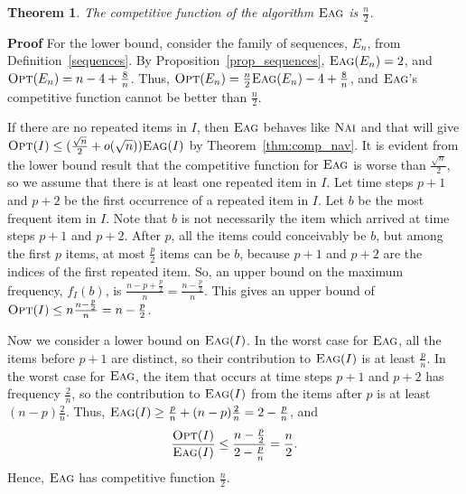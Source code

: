 \documentclass[11pt]{article}
\newtheorem{xtheorem}{Theorem}
\newenvironment{theorem}{\begin{xtheorem}\rm}{\end{xtheorem}}
\newenvironment{proof}{\begin{trivlist}\item[]{\bf Proof }}{\hspace*{\fill}\raisebox{-1pt}{\boldmath$\Box$}\end{trivlist}}
\newcommand{\opt}{{\ensuremath{\textsc{Opt}}}\xspace}
\newcommand{\nav}{{\ensuremath{\textsc{Nai}}}\xspace}
\newcommand{\eag}{{\ensuremath{\textsc{Eag}}}\xspace}
\begin{document}
\begin{theorem}\label{thm:comp_eag}
The competitive function of the algorithm \eag is $\frac{n}{2}$.
\end{theorem}
\begin{proof}
For the lower bound, consider the family of sequences, $E_n$, from
Definition~\ref{sequences}.
By Proposition~\ref{prop_sequences}, $\eag(E_n) =2$, and $\opt(E_n) = n-4+\frac{8}{n}$.
Thus, $\opt(E_n) = \frac{n}{2}\eag(E_n) -4 + \frac{8}{n}$, and \eag's competitive function cannot be better than $\frac{n}{2}$.

If there are no repeated items in $I$, then \eag behaves like \nav and that will give $\opt(I) \leq (\frac{\sqrt{n}}{2}+o(\sqrt{n}))\eag(I)$ by Theorem~\ref{thm:comp_nav}.
It is evident from the lower bound result that the competitive function for \eag  is worse than
$\frac{\sqrt{n}}{2}$, so we assume that there is at least one repeated item in $I$.
Let time steps $p+1$ and $p+2$ be the first  occurrence of a repeated
item in $I$.
Let $b$ be the most frequent item in $I$. Note that $b$ is not necessarily the
item which arrived at time steps $p+1$ and $p+2$.
After $p$, all the items could conceivably be $b$, but among the first $p$ items, at most $\frac{p}{2}$ items can be $b$, because $p+1$ and $p+2$ are the indices of the first repeated item.
So, an upper bound on the maximum frequency, $f_I(b)$, is $\frac{n-p + \frac{p}{2}}{n} = \frac{n-\frac{p}{2}}{n}$.
This gives an upper bound of $\opt(I) \leq n\frac{n-\frac{p}{2}}{n} = n-\frac{p}{2}$.


Now we  consider a lower bound on $\eag(I)$.
In the worst case for \eag, all the items before $p+1$ are
distinct, so their contribution to $\eag(I)$ is at least $\frac{p}{n}$.
In the worst case for \eag, the item that occurs at
time steps $p+1$ and $p+2$ has frequency $\frac{2}{n}$, so the contribution
to $\eag(I)$ from the items after $p$ is at least  $(n-p)\frac{2}{n}$.
Thus, $\eag(I) \geq \frac{p}{n} + (n-p)\frac{2}{n} = 2 - \frac{p}{n}$,
and $$\frac{\opt(I)}{\eag(I)} \leq \frac{n-\frac{p}{2}}{2-\frac{p}{n}}=\frac{n}{2}.$$
Hence, \eag has competitive function $\frac{n}{2}$.
\end{proof}
\end{document}
